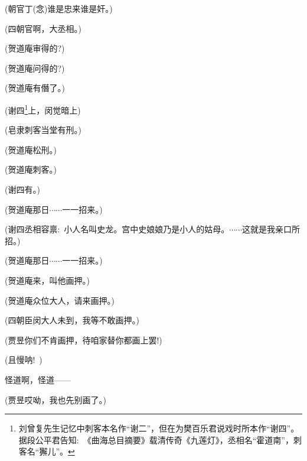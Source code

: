 {(朝官丁\hspace{20pt}({\akai 念})谁是忠来谁是奸。)

(四朝官\hspace{20pt}啊，大丞相。)

(贺道庵\hspace{20pt}审得的?)

(贺道庵\hspace{20pt}问得的?)

(贺道庵\hspace{20pt}有僭了。)

(谢四\footnote{刘曾复先生记忆中刺客本名作``谢二''，但在为樊百乐{\scriptsize 君}说戏时所本作``谢四''。  据段公平{\scriptsize 君}告知:~《曲海总目摘要》载清传奇《九莲灯》，丞相名``霍道南''，刺客名``獬儿''。}{\hwfs 上}，闵觉{\hwfs 暗上})

(皂隶\hspace{30pt}刺客当堂有刑。)

(贺道庵\hspace{20pt}松刑。)

(贺道庵\hspace{20pt}刺客。)

(谢四\hspace{30pt}有。)

(贺道庵\hspace{20pt}那日$\cdots{}\cdots{}$一一招来。)

(谢四\hspace{30pt}丞相容禀:~小人名叫史龙。宫中史娘娘乃是小人的姑母。$\cdots{}\cdots{}$这就是我亲口所招。)

(贺道庵\hspace{20pt}那日$\cdots{}\cdots{}$一一招来。)

(贺道庵\hspace{20pt}来，叫他画押。)

(贺道庵\hspace{20pt}众位大人，请来画押。)

(四朝臣\hspace{20pt}闵大人未到，我等不敢画押。)

(贾昱\hspace{30pt}你们不肯画押，待咱家替你都画上罢!)

(且慢呐!~)

怪道啊，怪道------

(贾昱\hspace{30pt}哎呦，我也先别画了。)



}

